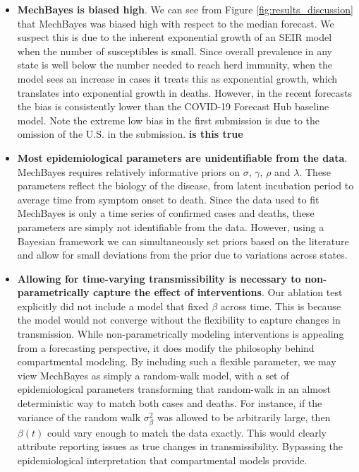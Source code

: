 \documentclass{umassthesis}          %
\begin{document}
\begin{itemize}
\item \textbf{MechBayes is biased high}. We can see from Figure \ref{fig:results_discussion} that MechBayes was biased high with respect to the median forecast. We suspect this is due to the inherent exponential growth of an SEIR model when the number of susceptibles is small. Since overall prevalence in any state is well below the number needed to reach herd immunity, when the model sees an increase in cases it treats this as exponential growth, which translates into exponential growth in deaths. However, in the recent forecasts the bias is consistently lower than the COVID-19 Forecast Hub baseline model. Note the extreme low bias in the first submission is due to the omission of the U.S. in the submission. \textbf{is this true} 

\item \textbf{Most epidemiological parameters are unidentifiable from the data}. MechBayes requires relatively informative priors on $\sigma$, $\gamma$, $\rho$ and $\lambda$. These parameters reflect the biology of the disease, from latent incubation period to average time from symptom onset to death. Since the data used to fit MechBayes is only a time series of confirmed cases and deaths, these parameters are simply not identifiable from the data. However, using a Bayesian framework we can simultaneously set priors based on the literature and allow for small deviations from the prior due to variations across states. 




\item \textbf{Allowing for time-varying transmissibility is necessary to non-parametrically capture the effect of  interventions}. Our ablation test explicitly did not include a model that fixed $\beta$ across time. This is because the model would not converge without the flexibility to capture changes in transmission. While non-parametrically modeling interventions is appealing from a forecasting perspective, it does modify the philosophy behind compartmental modeling. By including such a flexible parameter, we may view MechBayes as simply a random-walk model, with a set of epidemiological parameters transforming that random-walk in an almost deterministic way to match both cases and deaths. For instance, if the variance of the random walk $\sigma_{\beta}^2$ was allowed to be arbitrarily large, then $\beta(t)$ could vary enough to match the data exactly. This would clearly attribute reporting issues as true changes in transmissibility. Bypassing the epidemiological interpretation that compartmental models provide. 

\end{itemize}
\end{document}

